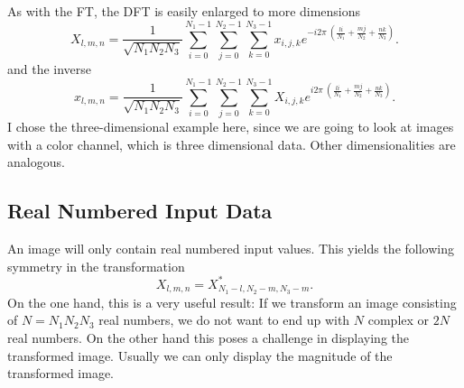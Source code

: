 As with the FT, the DFT is easily enlarged to more dimensions
\begin{equation}
    X_{l,m,n} = \frac{1}{\sqrt{N_1N_2N_3}}\sum_{i=0}^{N_1-1}\sum_{j=0}^{N_2-1}\sum_{k=0}^{N_3-1} x_{i,j,k} e^{-i{2\pi}\ \left(\!\frac{li}{N_1}+\frac{mj}{N_2}+\frac{nk}{N_3}\right)}.
\end{equation}
and the inverse
\begin{equation}
    x_{l,m,n} = \frac{1}{\sqrt{N_1N_2N_3}}\sum_{i=0}^{N_1-1}\sum_{j=0}^{N_2-1}\sum_{k=0}^{N_3-1} X_{i,j,k} e^{i{2\pi}\ \left(\!\frac{li}{N_1}+\frac{mj}{N_2}+\frac{nk}{N_3}\right)}.
\end{equation}
I chose the three-dimensional example here, since we are going to look at images with a color channel, which is three dimensional data.
Other dimensionalities are analogous.

\subsection{Real Numbered Input Data}
An image will only contain real numbered input values. This yields the following symmetry in the transformation
\begin{equation}
    X_{l,m,n} = X^*_{N_1-l,N_2-m,N_3-m}.
    \label{eqn:realFSymmetry}
\end{equation}
On the one hand, this is a very useful result: If we transform an image consisting of $N=N_1N_2N_3$ real numbers,
we do not want to end up with $N$ complex or $2N$ real numbers.
On the other hand this poses a challenge in displaying the transformed image.
Usually we can only display the magnitude of the transformed image.

